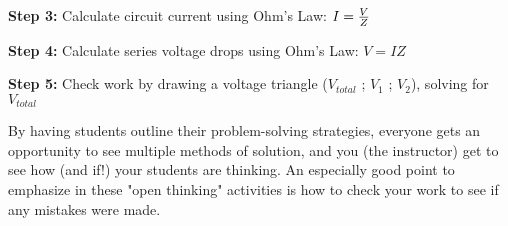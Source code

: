 {\bf Step 3:} Calculate circuit current using Ohm's Law: $I = {V \over Z}$

{\bf Step 4:} Calculate series voltage drops using Ohm's Law: $V = {I Z}$

{\bf Step 5:} Check work by drawing a voltage triangle ($V_{total}$ ; $V_1$ ; $V_2$), solving for $V_{total}$

\vskip 10pt

By having students outline their problem-solving strategies, everyone gets an opportunity to see multiple methods of solution, and you (the instructor) get to see how (and if!) your students are thinking.  An especially good point to emphasize in these "open thinking" activities is how to check your work to see if any mistakes were made.




